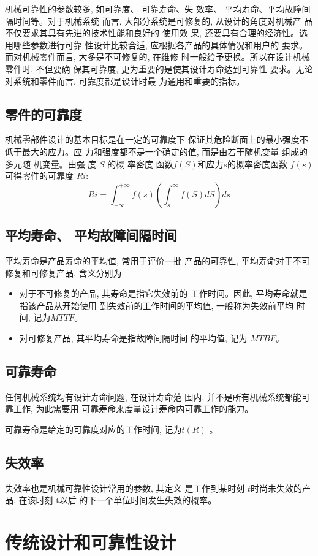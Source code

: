 \documentclass[a4paper,12pt]{article}
\begin{document}
机械可靠性的参数较多, 如可靠度、 可靠寿命、失 效率、 平均寿命、平均故障间隔时间等。对于机械系统 而言, 大部分系统是可修复的, 从设计的角度对机械产 品不仅要求其具有先进的技术性能和良好的 使用效 果, 还要具有合理的经济性。选用哪些参数进行可靠 性设计比较合适, 应根据各产品的具体情况和用户的 要求。而对机械零件而言, 大多是不可修复的, 在维修 时一般给予更换。所以在设计机械零件时, 不但要确 保其可靠度, 更为重要的是使其设计寿命达到可靠性 要求。无论对系统和零件而言, 可靠度都是设计时最 为通用和重要的指标。

\subsection{零件的可靠度}
机械零部件设计的基本目标是在一定的可靠度下 保证其危险断面上的最小强度不低于最大的应力。应 力和强度都不是一个确定的值, 而是由若干随机变量 组成的多元随 机变量。由强 度 $S $ 的概 率密度 函数$ f (S )$和应力$ s$的概率密度函数 $f ( s)$可得零件的可靠度 $R i$:
$$  Ri = \int_{-\infty}^{+\infty} f(s)\left( \int_s^\infty f(S)dS \right) ds $$

\subsection{平均寿命、 平均故障间隔时间}
平均寿命是产品寿命的平均值, 常用于评价一批 产品的可靠性, 平均寿命对于不可修复和可修复产品, 含义分别为:
\begin{itemize}
	\item  对于不可修复的产品, 其寿命是指它失效前的 工作时间。因此, 平均寿命就是指该产品从开始使用 到失效前的工作时间的平均值, 一般称为失效前平均 时间, 记为$ MTTF $。
	\item 对可修复产品, 其平均寿命是指故障间隔时间 的平均值, 记为 $MTBF$。
\end{itemize}
\subsection{可靠寿命}
任何机械系统均有设计寿命问题, 在设计寿命范 围内, 并不是所有机械系统都能可靠工作, 为此需要用 可靠寿命来度量设计寿命内可靠工作的能力。

 可靠寿命是给定的可靠度对应的工作时间, 记为$ t (R ) $ 。
\subsection{失效率}
失效率也是机械可靠性设计常用的参数, 其定义 是工作到某时刻 $t $时尚未失效的产品, 在该时刻 t以后 的下一个单位时间发生失效的概率。

\section{传统设计和可靠性设计}
\end{document}

